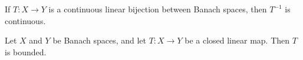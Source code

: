 \documentclass[article, a4paper, 11pt, oneside]{memoir}
\makeatletter
\numberwithin{equation}{chapter}
\theoremstyle{myexample}
\theoremstyle{myexample}
\theoremstyle{myexamplebreak}
\theoremstyle{myexamplebreak}
\theoremstyle{nonumberplain}
\newtheorem{proof}{\protect\@proof}
\theoremstyle{MyNonumberplain}
\newcommand{\@proof}{}
\renewcommand{\@proof}{Proof}%
\renewcommand{\@proof}{Bevis}%
\makeatother
\begin{document}




\begin{theorem}
    \label{thm:bounded_inverse}
    If $T\colon X \to Y$ is a continuous linear bijection between Banach spaces, then $T^{-1}$ is continuous.
\end{theorem}


\begin{theorem}
    \label{thm:closed_graph}
    Let $X$ and $Y$ be Banach spaces, and let $T\colon X \to Y$ be a closed linear map. Then $T$ is bounded.
\end{theorem}

    
\end{document}
